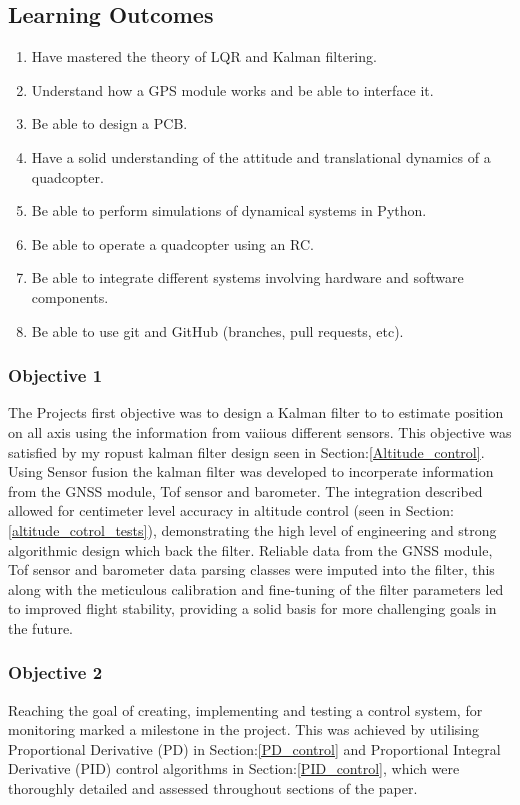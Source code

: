 \documentclass{report}
\begin{document}
\subsection*{Learning Outcomes}
\begin{enumerate}
  \item Have mastered the theory of LQR and Kalman filtering.
  \item Understand how a GPS module works and be able to interface it.
  \item Be able to design a PCB.
  \item Have a solid understanding of the attitude and translational dynamics of
  a quadcopter.
  \item Be able to perform simulations of dynamical systems in Python.
  \item Be able to operate a quadcopter using an RC.
  \item Be able to integrate different systems involving hardware and software
  components.
  \item Be able to use git and GitHub (branches, pull requests, etc).
\end{enumerate}

\subsubsection*{Objective 1}
The Projects first objective was to design a Kalman filter to to estimate
position on all axis using the information from vaiious different sensors. This
objective was satisfied by my ropust  kalman filter design seen in
Section:\ref{Altitude_control}. Using Sensor fusion the kalman filter was
developed to incorperate information from the GNSS module, Tof sensor and
barometer. The integration described allowed for centimeter level accuracy in
altitude control (seen in Section:\ref{altitude_cotrol_tests}), demonstrating
the high level of engineering and strong algorithmic design which back the
filter. Reliable data from the GNSS module, Tof sensor and barometer data
parsing classes were imputed into the filter, this along with the meticulous
calibration and fine-tuning of the filter parameters led to improved flight
stability, providing a solid basis for more challenging goals in the future.

\subsubsection*{Objective 2}
Reaching the goal of creating, implementing and testing a control system, for
monitoring marked a milestone in the project. This was achieved by utilising
Proportional Derivative (PD) in Section:\ref{PD_control} and Proportional
Integral Derivative (PID) control algorithms in Section:\ref{PID_control}, which
were thoroughly detailed and assessed throughout sections of the paper.
\end{document}
